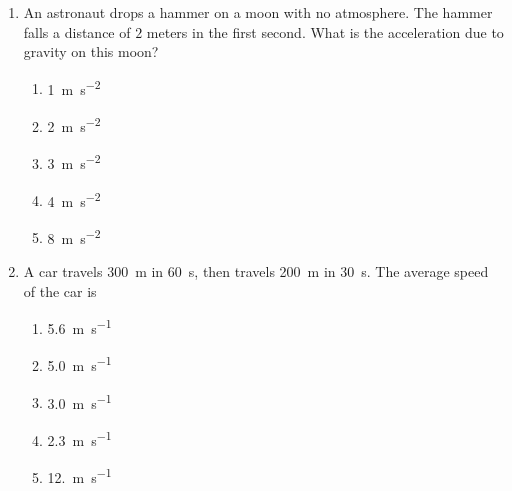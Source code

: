 \documentclass{../../oss-apphys}
\begin{document}
\begin{multicols}{2}
\begin{enumerate}[resume,leftmargin=18pt]
  \item An astronaut drops a hammer on a moon with no atmosphere. The hammer
    falls a distance of $2$ meters in the first second. What is the
    acceleration due to gravity on this moon?
    \begin{enumerate}[noitemsep,topsep=0pt,leftmargin=18pt,label=(\Alph*)]
    \item\SI{1}{\metre\per\second^2}
    \item\SI{2}{\metre\per\second^2}
    \item\SI{3}{\metre\per\second^2}
    \item\SI{4}{\metre\per\second^2}
    \item\SI{8}{\metre\per\second^2}
    \end{enumerate}

  \item A car travels \SI{300}{m} in \SI{60}{s}, then travels \SI{200}{m} in
    \SI{30}{s}. The average speed of the car is
    \begin{enumerate}[noitemsep,topsep=0pt,leftmargin=18pt,label=(\Alph*)]
    \item\SI{5.6}{\metre\per\second}
    \item\SI{5.0}{\metre\per\second}
    \item\SI{3.0}{\metre\per\second}
    \item\SI{2.3}{\metre\per\second}
    \item\SI{12.}{\metre\per\second}
    \end{enumerate}
    \columnbreak
    

\end{enumerate}
\end{multicols}
\end{document}
